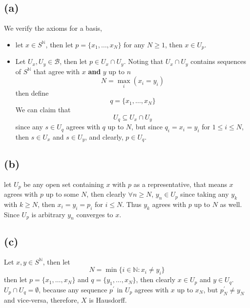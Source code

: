 \documentclass[a4paper,11pt]{article}
\begin{document}
\subsection{(a)}
We verify the axioms for a basis,
\begin{itemize}
	\item[(i)] let $x \in S^\mathbb{N}$, then let $p = \{x_1,\ldots,x_N\}$ for any $N \geq 1$, then $x \in U_p$. 
	\item[(ii)] Let $U_x, U_y \in \mathcal{B}$, then let $p \in U_x \cap U_y$. Noting that $U_x \cap U_y$ contains sequences of $S^\mathbb{N}$ that agree with $x$ \textbf{and} $y$ up to $n$
		\begin{equation}
			N = \max_{i} (x_i = y_i)
		\end{equation}
		then define 
		\begin{equation}
			q = \{x_1,\ldots,x_N\}
		\end{equation}
		We can claim that 
		\begin{equation}
			U_q \subseteq U_x \cap U_y
		\end{equation}
		since any $s \in U_q$ agrees with $q$ up to $N$, but since $q_i=x_i=y_i$ for $1 \leq i \leq N$, then $s \in U_x$ and $s \in U_y$, and clearly, $p \in U_q$. 
		
\end{itemize}
\subsection{(b)}
let $U_p$ be any open set containing $x$ with $p$ as a representative, that means $x$ agrees with $p$ up to some $N$, then clearly $\forall n \geq N$, $y_n \in U_p$ since taking any $y_k$ with $k \geq N$, then $x_i=y_i=p_i$ for $i \leq N$. Thus $y_k$ agrees with $p$ up to $N$ as well. Since $U_p$ is arbitrary $y_n$ converges to $x$. 
\subsection{(c)}
Let $x,y \in S^\mathbb{N}$, then let 
\begin{equation}
	N = \min \{i \in \mathbb{N} \colon x_i \neq y_i\} 
\end{equation}
then let $p = \{x_1,\ldots,x_{N}\}$ and $q = \{y_1,\ldots,x_{N}\}$, then clearly $x \in U_p$ and $y \in U_q$. $U_p \cap U_q = \emptyset$, because any sequence $p^\prime$ in $U_p$ agrees with $x$ up to $x_{N}$, but $p^\prime_{N} \neq y_{N}$ and vice-versa, therefore, $X$ is Hausdorff. 
\end{document}

